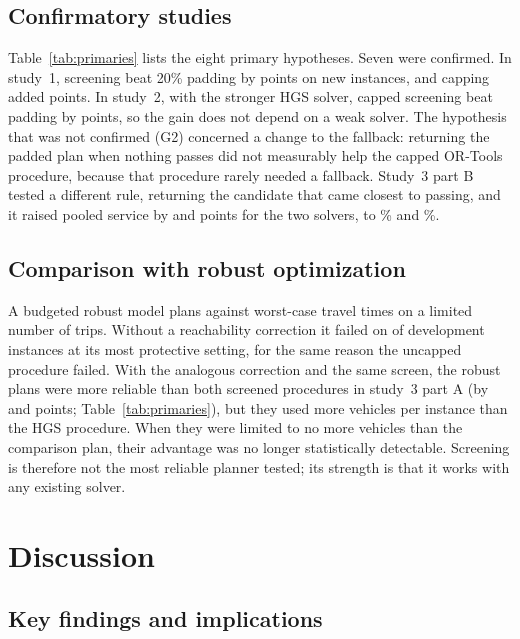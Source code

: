 \documentclass[12pt,letterpaper]{article}
\begin{document}




\subsection{Confirmatory studies}

Table~\ref{tab:primaries} lists the eight primary hypotheses. Seven were confirmed.
In study~1, screening beat 20\% padding by \ConfHOneMean{} points on new instances,
and capping added \ConfHTwoMean{} points. In study~2, with the stronger HGS solver,
capped screening beat padding by \CtwoGOneMean{} points, so the gain does not depend
on a weak solver. The hypothesis that was not confirmed (G2) concerned a change to
the fallback: returning the padded plan when nothing passes did not measurably help
the capped OR-Tools procedure, because that procedure rarely needed a fallback.
Study~3 part B tested a different rule, returning the candidate that came closest to
passing, and it raised pooled service by \PbFOne{} and \PbFTwo{} points for the two
solvers, to \PbFThree\% and \PbFFour\%.



\subsection{Comparison with robust optimization}

A budgeted robust model plans against worst-case travel times on a limited number
of trips. Without a reachability correction it failed on \RobNoPlanBoxSix{} of
\RobInstances{} development instances at its most protective setting, for the same
reason the uncapped procedure failed. With the analogous correction and the same
screen, the robust plans were more reliable than both screened procedures in
study~3 part A (by \PaROne{} and \PaRTwo{} points; Table~\ref{tab:primaries}), but
they used \PaRThree{} more vehicles per instance than the HGS procedure. When they
were limited to no more vehicles than the comparison plan, their advantage was no
longer statistically detectable. Screening is therefore not the most reliable
planner tested; its strength is that it works with any existing solver.

\section{Discussion}

\subsection{Key findings and implications}
\end{document}
